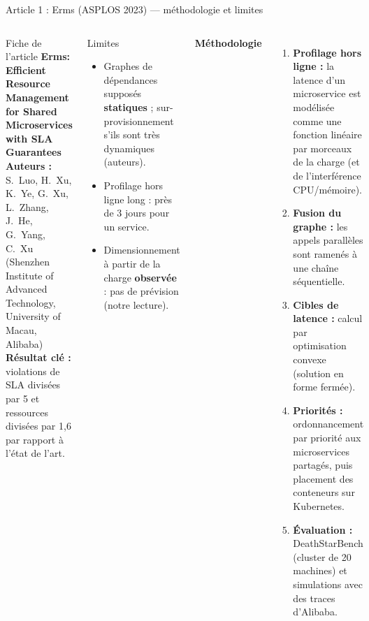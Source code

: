 \documentclass[aspectratio=169,10pt]{beamer}
\begin{document}
\begin{frame}{Article 1 : Erms (ASPLOS 2023) --- méthodologie et limites}
  \begin{columns}[T]
    \begin{block}{Fiche de l'article}
      \scriptsize
      \textbf{Erms: Efficient Resource Management for Shared Microservices with SLA Guarantees}\\[2pt]
      \textbf{Auteurs :} S.~Luo, H.~Xu, K.~Ye, G.~Xu, L.~Zhang, J.~He, G.~Yang, C.~Xu (Shenzhen Institute of Advanced Technology, University of Macau, Alibaba)\\[2pt]
      \textbf{Résultat clé :} violations de SLA divisées par 5 et ressources divisées par 1,6 par rapport à l'état de l'art.
    \end{block}
    \begin{alertblock}{Limites}
      \scriptsize
      \begin{itemize}
        \item Graphes de dépendances supposés \textbf{statiques} ; sur-provisionnement s'ils sont très dynamiques (auteurs).
        \item Profilage hors ligne long : près de 3 jours pour un service.
        \item Dimensionnement à partir de la charge \textbf{observée} : pas de prévision (notre lecture).
      \end{itemize}
    \end{alertblock}

    \textbf{Méthodologie}
    \small
    \begin{enumerate}
      \item \textbf{Profilage hors ligne :} la latence d'un microservice est modélisée comme une fonction linéaire par morceaux de la charge (et de l'interférence CPU/mémoire).
      \item \textbf{Fusion du graphe :} les appels parallèles sont ramenés à une chaîne séquentielle.
      \item \textbf{Cibles de latence :} calcul par optimisation convexe (solution en forme fermée).
      \item \textbf{Priorités :} ordonnancement par priorité aux microservices partagés, puis placement des conteneurs sur Kubernetes.
      \item \textbf{Évaluation :} DeathStarBench (cluster de 20 machines) et simulations avec des traces d'Alibaba.
    \end{enumerate}
  \end{columns}
\end{frame}
\end{document}
